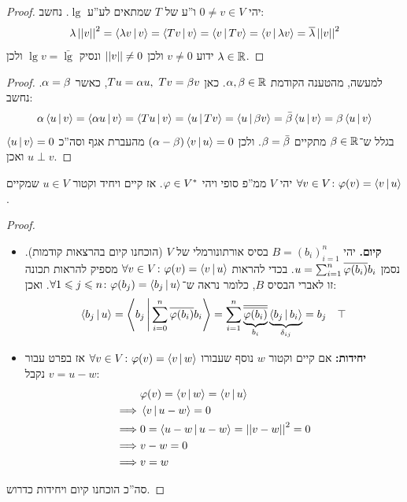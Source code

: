 \documentclass[name=רשימות אלגברה לינארית 2א]{../../../tex/classes/megasumPreamble}
\begin{document}
	\begin{proof}
		יהי $0 \neq v \in V$ ו''ע של $T$ שמתאים לע''ע $\lg$. נחשב: 
		\[ \lg \norm{v}^2 = \mut{\lg v}{v} = \mut{T v}{v} = \mut{v}{Tv} = \mut{v}{\lg v} = \ol \lg \norm{v}^{2} \]
		ידוע $v \neq 0$ ולכן $\norm{v} \neq 0$ ונסיק $\lg v = \bar \lg $ ולכן $\lg \in \R$. 
	\end{proof}
	
	\begin{proof}
		למעשה, מהטענה הקודמת $\ag, \bg \in \R$. כאן $Tu = \ag u, \ Tv = \bg v$, כאשר $\ag = \bg$. נחשב: 
		\[ \ag \mut{u}{v} = \mut{\ag u}{v} = \mut{Tu}{v} = \mut{u}{Tv} = \mut{u}{\bg v} = \bar \bg \mut{u}{v} = \bg \mut{u}{v} \]
		בגלל ש־$\bg \in \R$ מתקיים $\bg = \bar \bg$. ולכן $(\ag - \bg)\mut{v}{u} = 0$ מהעברת אגף וסה''כ $\mut{u}{v} = 0$ ואכן $u \perp v$. 
	\end{proof}
	
	
	
	\begin{Theorem}
		יהי $V$ ממ''פ סופי ויהי $\vphi \in V^*$. אז קיים ויחיד וקטור $u \in V$ שמקיים $\forall v \in V \co \vphi(v) = \mut{v}{u}$. 
	\end{Theorem}\begin{proof}\,
		
		\begin{itemize}
			\item \textbf{קיום. }יהי $B = (b_i)_{i = 1}^{n}$ בסיס אורתונורמלי של $V$ (הוכחנו קיום בהרצאות קודמות). נסמן $u = \sum_{i =1}^{n}\ol{\phi(b_i)} b_i$. בכדי להראות $\forall v \in V \co \phi(v) = \mut{v}{u}$ מספיק להראות תכונה זו לאברי הבסיס $B$, כלומר נראה ש־$\forall 1 \le j \le n \co \phi(b_j) = \mut{b_j}{u}$. ואכן: 
			\[ \mut{b_j}{u} = \mut{b_j}{\sumni \ol{\phi(b_i)}b_i} = \sum_{i = 1}^{n}\underbrace{\ol{\ol{\phi(b_i)}}}_{b_i}\underbrace{\mut{b_j}{b_i}}_{\dg_{ij}} = b_j \quad \top \]
			\item \textbf{יחידות: }אם קיים וקטור $w$ נוסף שעבורו $\forall v \in V \co \phi(v) = \mut{v}{w}$ אז בפרט עבור $v = u - w$ נקבל: 
			\begin{align*}
				&\phi(v) = \mut{v}{w} = \mut{v}{u} \\
				\implies &\mut{v}{u - w} = 0 \\ 
				\implies &0 = \mut{u - w}{u - w} = \norm{v - w}^{2} = 0 \\ 
				\implies &v - w = 0 \\
				\implies &v = w
			\end{align*}
		\end{itemize}
		סה''כ הוכחנו קיום ויחידות כדרוש. 
	\end{proof}
	
\end{document}
